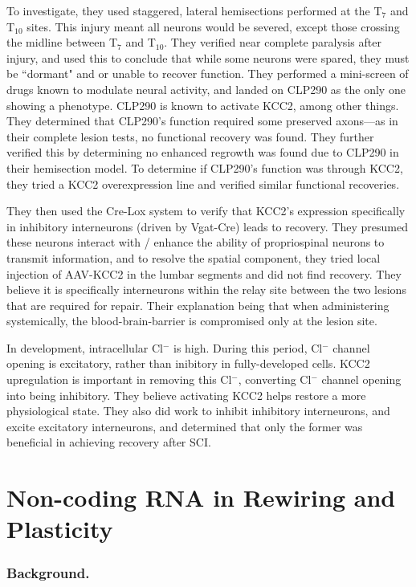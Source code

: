 \documentclass[12pt]{report}
\begin{document}
To investigate, they used staggered, lateral hemisections performed at the T$_7$ and T$_{10}$ sites. This injury meant all neurons would be severed, except those crossing the midline between T$_7$ and T$_{10}$. They verified near complete paralysis after injury, and used this to conclude that while some neurons were spared, they must be ``dormant" and or unable to recover function. They performed a mini-screen of drugs known to modulate neural activity, and landed on CLP290 as the only one showing a phenotype. CLP290 is known to activate KCC2, among other things. They determined that CLP290's function required some preserved axons---as in their complete lesion tests, no functional recovery was found. They further verified this by determining no enhanced regrowth was found due to CLP290 in their hemisection model. To determine if CLP290's function was through KCC2, they tried a KCC2 overexpression line and verified similar functional recoveries.\newline

They then used the Cre-Lox system to verify that KCC2's expression specifically in inhibitory interneurons (driven by Vgat-Cre) leads to recovery. They presumed these neurons interact with / enhance the ability of propriospinal neurons to transmit information, and to resolve the spatial component, they tried local injection of AAV-KCC2 in the lumbar segments and did not find recovery. They believe it is specifically interneurons within the relay site between the two lesions that are required for repair. Their explanation being that when administering systemically, the blood-brain-barrier is compromised only at the lesion site.\newline

In development, intracellular Cl$^-$ is high. During this period, Cl$^-$ channel opening is excitatory, rather than inibitory in fully-developed cells. KCC2 upregulation is important in removing this Cl$^-$, converting Cl$^-$ channel opening into being inhibitory. They believe activating KCC2 helps restore a more physiological state. They also did work to inhibit inhibitory interneurons, and excite excitatory interneurons, and determined that only the former was beneficial in achieving recovery after SCI. 


\section{Non-coding RNA in Rewiring and Plasticity}

\subsubsection{Background.}
\end{document}
